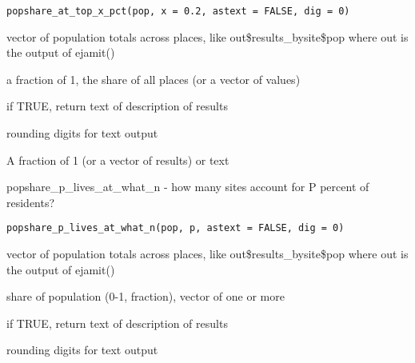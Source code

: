 \documentclass[a4paper]{book}
\begin{document}
%
\begin{Usage}
\begin{verbatim}
popshare_at_top_x_pct(pop, x = 0.2, astext = FALSE, dig = 0)
\end{verbatim}
\end{Usage}
%
\begin{Arguments}
\begin{ldescription}
\item[\code{pop}] vector of population totals across places,
like out\$results\_bysite\$pop where out is the output of ejamit()

\item[\code{x}] a fraction of 1, the share of all places (or a vector of values)

\item[\code{astext}] if TRUE, return text of description of results

\item[\code{dig}] rounding digits for text output
\end{ldescription}
\end{Arguments}
%
\begin{Value}
A fraction of 1 (or a vector of results) or text
\end{Value}
%
\begin{Examples}
\end{Examples}
%
\begin{Description}\relax
popshare\_p\_lives\_at\_what\_n  - how many sites account for P percent of residents?
\end{Description}
%
\begin{Usage}
\begin{verbatim}
popshare_p_lives_at_what_n(pop, p, astext = FALSE, dig = 0)
\end{verbatim}
\end{Usage}
%
\begin{Arguments}
\begin{ldescription}
\item[\code{pop}] vector of population totals across places,
like out\$results\_bysite\$pop where out is the output of ejamit()

\item[\code{p}] share of population (0-1, fraction), vector of one or more

\item[\code{astext}] if TRUE, return text of description of results

\item[\code{dig}] rounding digits for text output
\end{ldescription}
\end{Arguments}
\end{document}
